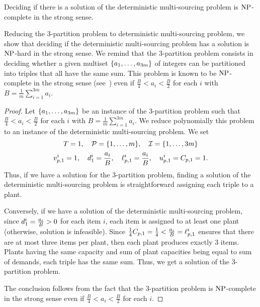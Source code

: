 \begin{thm}\label{thm:deterministic-multi-sourcing:strong-NP-hard}
  Deciding if there is a solution of the deterministic multi-sourcing problem is $\operatorname{NP}$-complete in the strong sense.
\end{thm}


Reducing the 3-partition problem to deterministic multi-sourcing problem, we show that deciding if the deterministic multi-sourcing problem has a solution is $\operatorname{NP}$-hard in the strong sense.
We remind that the 3-partition problem consists in deciding whether a given multiset $\crbracket{a_1,\ldots,a_{3m}}$ of integers can be partitioned into triples that all have the same sum.
This problem is known to be $\operatorname{NP}$-complete in the strong sense (see~\citet{Garey1979}) even if $\frac{B}{4} < a_i < \frac{B}{2}$ for each $i$ with $B=\frac{1}{m}\sum_{i=1}^{3m}a_i$.


\begin{proof}
Let $\crbracket{a_1,\ldots,a_{3m}}$ be an instance of the 3-partition problem such that $\frac{B}{4} < a_i < \frac{B}{2}$ for each $i$ with $B=\frac{1}{m}\sum_{i=1}^{3m}a_i$.
We reduce polynomially this problem to an instance of the deterministic multi-sourcing problem.
We set
$$
  \horizon=1
  ,\quad
  \plants=\range[1]{m}
  ,\quad
  \REF=\range[1]{3m}
$$
$$
  v_{p,1}^i=1
  ,\quad
  d_1^i=\frac{a_i}{B}
  ,\quad
  \ell_{p,1}^i=\frac{a_i}{B}
  ,\quad
  u_{p,1}^i=C_{p,1}=1.
$$
Thus, if we have a solution for the 3-partition problem, finding a solution of the deterministic multi-sourcing problem is straightforward assigning each triple to a plant.

Conversely, if we have a solution of the deterministic multi-sourcing problem, since $d_1^i=\frac{a_i}{B}>0$ for each item $i$, each item is assigned to at least one plant (otherwise, solution is infeasible).
Since $\frac{1}{4}C_{p,1}=\frac{1}{4} < \frac{a_i}{B} = \ell_{p,1}^i$ ensures that there are at most three items per plant, then each plant produces exactly 3 items.
Plants having the same capacity and sum of plant capacities being equal to sum of demands, each triple has the same sum.
Thus, we get a solution of the 3-partition problem.

The conclusion follows from the fact that the 3-partition problem is $\operatorname{NP}$-complete in the strong sense even if $\frac{B}{4} < a_i < \frac{B}{2}$ for each $i$.
\end{proof}


